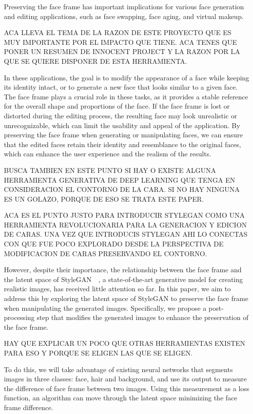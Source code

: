 \documentclass[review]{elsarticle}
\begin{document}
Preserving the face frame has important implications for various face generation and editing applications, such as face swapping, face aging, and virtual makeup. 

ACA LLEVA EL TEMA DE LA RAZON DE ESTE PROYECTO QUE ES MUY IMPORTANTE POR EL IMPACTO QUE TIENE.   ACA TENES QUE PONER UN RESUMEN DE INNOCENT PROJECT Y LA RAZON POR LA QUE SE QUIERE DISPONER DE ESTA HERRAMIENTA.

In these applications, the goal is to modify the appearance of a face while keeping its identity intact, or to generate a new face that looks similar to a given face. The face frame plays a crucial role in these tasks, as it provides a stable reference for the overall shape and proportions of the face. If the face frame is lost or distorted during the editing process, the resulting face may look unrealistic or unrecognizable, which can limit the usability and appeal of the application. By preserving the face frame when generating or manipulating faces, we can ensure that the edited faces retain their identity and resemblance to the original faces, which can enhance the user experience and the realism of the results.

BUSCA TAMBIEN EN ESTE PUNTO SI HAY O EXISTE ALGUNA HERRAMIENTA GENERATIVA DE DEEP LEARNING QUE TENGA EN CONSIDERACION EL CONTORNO DE LA CARA.  SI NO HAY NINGUNA ES UN GOLAZO, PORQUE DE ESO SE TRATA ESTE PAPER.

ACA ES EL PUNTO JUSTO PARA INTRODUCIR STYLEGAN COMO UNA HERRAMIENTA REVOLUCIONARIA PARA LA GENERACION Y EDICION DE CARAS.  UNA VEZ QUE INTRODUCIS STYLEGAN AHI LO CONECTAS CON QUE FUE POCO EXPLORADO DESDE LA PERSPECTIVA DE MODIFICACION DE CARAS PRESERVANDO EL CONTORNO.

However, despite their importance, the relationship between the face frame and the latent space of StyleGAN~\cite{stylegan1}~\cite{stylegan2}, a state-of-the-art generative model for creating realistic images, has received little attention so far. In this paper, we aim to address this by exploring the latent space of StyleGAN to preserve the face frame when manipulating the generated images. Specifically, we propose a post-processing step that modifies the generated images to enhance the preservation of the face frame.

HAY QUE EXPLICAR UN POCO QUE OTRAS HERRAMIENTAS EXISTEN PARA ESO Y PORQUE SE ELIGEN LAS QUE SE ELIGEN.

To do this, we will take advantage of existing neural networks that segments images in three classes: face, hair and background, and use its output to measure the difference of face frame between two images. Using this measurement as a loss function, an algorithm can move through the latent space minimizing the face frame difference.
\end{document}
